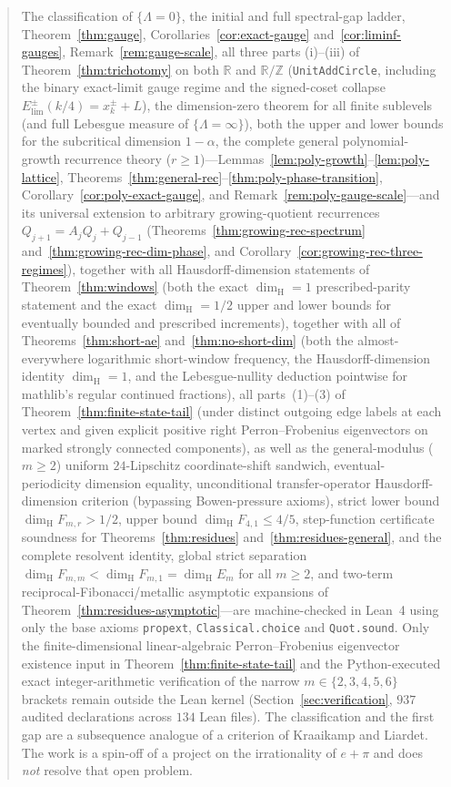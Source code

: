 \documentclass[11pt]{article}
\theoremstyle{definition}
\theoremstyle{remark}
\newcommand{\R}{\mathbb{R}}
\newcommand{\Z}{\mathbb{Z}}
\newcommand{\dimH}{\dim_{\mathrm{H}}}
\newcommand{\Lam}{\Lambda}
\begin{document}
\begin{abstract}
The classification of $\{\Lam=0\}$, the initial and full spectral-gap ladder,
Theorem~\ref{thm:gauge},
Corollaries~\ref{cor:exact-gauge} and~\ref{cor:liminf-gauges},
Remark~\ref{rem:gauge-scale}, all three parts (i)--(iii) of
Theorem~\ref{thm:trichotomy} on both $\R$ and $\R/\Z$ (\texttt{UnitAddCircle},
including the binary exact-limit gauge regime and the signed-coset collapse
$E_{\mathrm{lim}}^\pm(k/4)=x_k^\pm+L$), the dimension-zero theorem for all
finite sublevels (and full Lebesgue measure of $\{\Lam=\infty\}$), both the upper
and lower bounds for the subcritical dimension $1-\alpha$, the complete
general polynomial-growth recurrence theory ($r\ge1$)---Lemmas~\ref{lem:poly-growth}--\ref{lem:poly-lattice},
Theorems~\ref{thm:general-rec}--\ref{thm:poly-phase-transition},
Corollary~\ref{cor:poly-exact-gauge}, and Remark~\ref{rem:poly-gauge-scale}---and
its universal extension to arbitrary growing-quotient recurrences
$Q_{j+1}=A_jQ_j+Q_{j-1}$ (Theorems~\ref{thm:growing-rec-spectrum}
and~\ref{thm:growing-rec-dim-phase}, and
Corollary~\ref{cor:growing-rec-three-regimes}), together
with all Hausdorff-dimension statements of Theorem~\ref{thm:windows} (both the
exact $\dimH=1$ prescribed-parity statement and the exact $\dimH=1/2$ upper and lower bounds for eventually bounded and prescribed
increments), together with all of Theorems~\ref{thm:short-ae} and~\ref{thm:no-short-dim}
(both the almost-everywhere logarithmic short-window frequency, the
Hausdorff-dimension identity $\dimH=1$, and the Lebesgue-nullity deduction
pointwise for mathlib's regular continued fractions), all parts~(1)--(3) of
Theorem~\ref{thm:finite-state-tail} (under distinct outgoing edge labels at each
vertex and given explicit positive right Perron--Frobenius eigenvectors on marked
strongly connected components), as well as the general-modulus ($m\ge2$)
uniform $24$-Lipschitz coordinate-shift sandwich, eventual-periodicity dimension
equality, unconditional transfer-operator Hausdorff-dimension criterion
(bypassing Bowen-pressure axioms), strict lower bound $\dimH F_{m,r}>1/2$, upper
bound $\dimH F_{4,1}\le 4/5$, step-function certificate soundness for
Theorems~\ref{thm:residues} and~\ref{thm:residues-general}, and the complete
resolvent identity, global strict separation $\dimH F_{m,m}<\dimH F_{m,1}=\dimH E_m$
for all $m\ge2$, and two-term reciprocal-Fibonacci/metallic asymptotic expansions of
Theorem~\ref{thm:residues-asymptotic}---are machine-checked in
Lean~4 using only the base axioms \texttt{propext}, \texttt{Classical.choice}
and \texttt{Quot.sound}.
Only the finite-dimensional linear-algebraic Perron--Frobenius eigenvector
existence input in Theorem~\ref{thm:finite-state-tail} and the Python-executed
exact integer-arithmetic verification of the narrow $m\in\{2,3,4,5,6\}$ brackets
remain outside the Lean kernel (Section~\ref{sec:verification}, $937$ audited
declarations across $134$ Lean files).
The classification and the first gap are a subsequence analogue of a criterion
of Kraaikamp and Liardet. The work is a spin-off of a project on the
irrationality of $e+\pi$ and does \emph{not} resolve that open problem.
\end{abstract}
\end{document}
